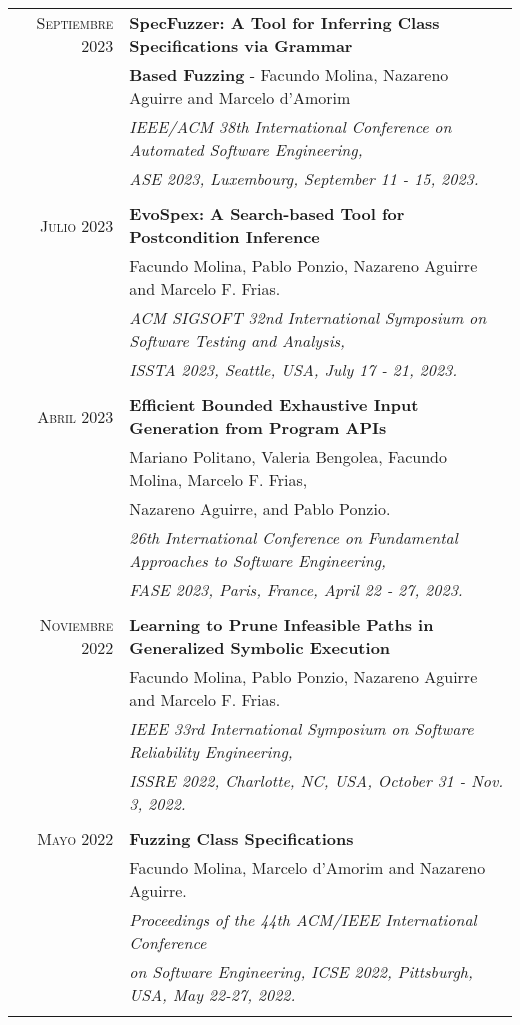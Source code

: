 \documentclass[a4paper,10pt]{article} %
\begin{document}
\begin{longtable}{rl}
\textsc{Septiembre} 2023  & \textbf{SpecFuzzer: A Tool for Inferring Class Specifications via Grammar} \\
        & \textbf{Based Fuzzing} - Facundo Molina, Nazareno Aguirre and Marcelo d'Amorim \\
        & \textit{IEEE/ACM 38th International Conference on Automated Software Engineering,} \\
        & \textit{ASE 2023, Luxembourg, September 11 - 15, 2023.} \\ & \\

\textsc{Julio} 2023  & \textbf{EvoSpex: A Search-based Tool for Postcondition Inference} \\
& Facundo Molina, Pablo Ponzio, Nazareno Aguirre and Marcelo F. Frias. \\
& \textit{ACM SIGSOFT 32nd International Symposium on Software Testing and Analysis,} \\
& \textit{ISSTA 2023, Seattle, USA, July 17 - 21, 2023.} \\ & \\

\textsc{Abril} 2023  & \textbf{Efficient Bounded Exhaustive Input Generation from Program APIs} \\
        & Mariano Politano, Valeria Bengolea, Facundo Molina, Marcelo F. Frias,\\
        & Nazareno Aguirre, and Pablo Ponzio. \\
	& \textit{26th International Conference on Fundamental Approaches to Software Engineering,} \\
        & \textit{FASE 2023, Paris, France, April 22 - 27, 2023.} \\ & \\

\textsc{Noviembre} 2022  & \textbf{Learning to Prune Infeasible Paths in Generalized Symbolic Execution} \\
        & Facundo Molina, Pablo Ponzio, Nazareno Aguirre and Marcelo F. Frias.\\
        & \textit{IEEE 33rd International Symposium on Software Reliability Engineering,} \\
        & \textit{ISSRE 2022, Charlotte, NC, USA, October 31 - Nov. 3, 2022.} \\ & \\

\textsc{Mayo} 2022  & \textbf{Fuzzing Class Specifications} \\
	& Facundo Molina, Marcelo d'Amorim and Nazareno Aguirre. \\
	& \textit{Proceedings of the 44th ACM/IEEE International Conference} \\
	& \textit{on Software Engineering, ICSE 2022, Pittsburgh, USA, May 22-27, 2022.} \\ & \\


\end{longtable}
\end{document}
